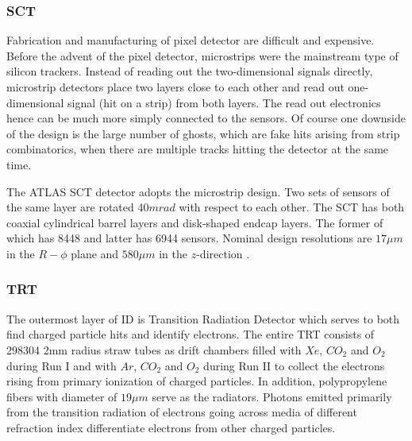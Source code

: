 \subsubsection{SCT}

Fabrication and manufacturing of pixel detector are difficult and expensive. Before the advent of the pixel detector, microstrips were the mainstream type of silicon trackers. Instead of reading out the two-dimensional signals directly, microstrip detectors place two layers close to each other and read out one-dimensional signal (hit on a strip) from both layers. The read out electronics hence can be much more simply connected to the sensors. Of course one downside of the design is the large number of ghosts, which are fake hits arising from strip combinatorics, when there are multiple tracks hitting the detector at the same time.

The ATLAS SCT detector adopts the microstrip design. Two sets of sensors of the same layer are rotated 40$mrad$ with respect to each other. The SCT has both coaxial cylindrical barrel layers and disk-shaped endcap layers. The former of which has 8448 and latter has 6944 sensors\cite{SCTpaper}. Nominal design resolutions are $17\mu m$ in the $R-\phi$ plane and $580 \mu m$ in the $z$-direction \cite{PERF-2007-01}.


\subsubsection{TRT}

The outermost layer of ID is Transition Radiation Detector\cite{TRTpaper} which serves to both find charged particle hits and identify electrons. The entire TRT consists of 298304 2mm radius straw tubes as drift chambers filled with $Xe$, $CO_2$ and $O_2$ during Run I and with $Ar$, $CO_2$ and $O_2$ during Run II to collect the electrons rising from primary ionization of charged particles. In addition, polypropylene fibers with diameter of $19\mu m$ serve as the radiators. Photons emitted primarily from the transition radiation of electrons going across media of different refraction index differentiate electrons from other charged particles. 
